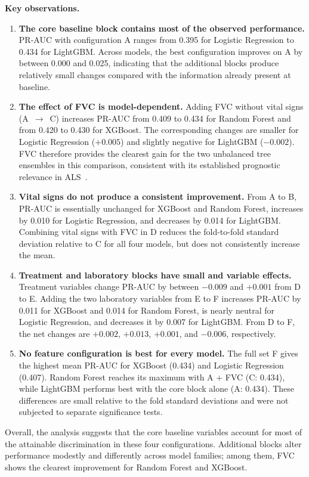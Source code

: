 \noindent\textbf{Key observations.}
\begin{enumerate}
  \item \textbf{The core baseline block contains most of the observed performance.}
    PR-AUC with configuration A ranges from 0.395 for Logistic Regression to 0.434 for LightGBM. Across models, the best configuration improves on A by between 0.000 and 0.025, indicating that the additional blocks produce relatively small changes compared with the information already present at baseline.
  \item \textbf{The effect of FVC is model-dependent.}
    Adding FVC without vital signs (A~$\to$~C) increases PR-AUC from 0.409 to 0.434 for Random Forest and from 0.420 to 0.430 for XGBoost. The corresponding changes are smaller for Logistic Regression ($+0.005$) and slightly negative for LightGBM ($-0.002$). FVC therefore provides the clearest gain for the two unbalanced tree ensembles in this comparison, consistent with its established prognostic relevance in ALS~\cite{Papaiz2022}.
  \item \textbf{Vital signs do not produce a consistent improvement.}
    From A to B, PR-AUC is essentially unchanged for XGBoost and Random Forest, increases by 0.010 for Logistic Regression, and decreases by 0.014 for LightGBM. Combining vital signs with FVC in D reduces the fold-to-fold standard deviation relative to C for all four models, but does not consistently increase the mean.
  \item \textbf{Treatment and laboratory blocks have small and variable effects.}
    Treatment variables change PR-AUC by between $-0.009$ and $+0.001$ from D to E. Adding the two laboratory variables from E to F increases PR-AUC by 0.011 for XGBoost and 0.014 for Random Forest, is nearly neutral for Logistic Regression, and decreases it by 0.007 for LightGBM. From D to F, the net changes are $+0.002$, $+0.013$, $+0.001$, and $-0.006$, respectively.
  \item \textbf{No feature configuration is best for every model.}
    The full set F gives the highest mean PR-AUC for XGBoost (0.434) and Logistic Regression (0.407). Random Forest reaches its maximum with A + FVC (C: 0.434), while LightGBM performs best with the core block alone (A: 0.434). These differences are small relative to the fold standard deviations and were not subjected to separate significance tests.
\end{enumerate}

Overall, the analysis suggests that the core baseline variables account for most of the attainable discrimination in these four configurations. Additional blocks alter performance modestly and differently across model families; among them, FVC shows the clearest improvement for Random Forest and XGBoost.


